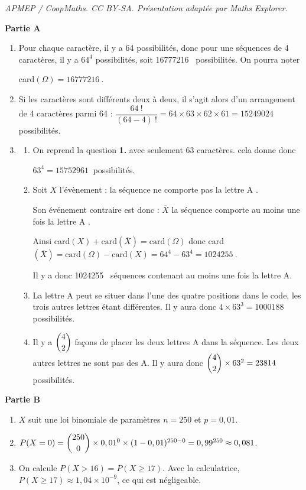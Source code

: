 \documentclass[10pt]{article}
\providecommand{\np}[2][]{{#2~#1}}
\begin{document}
\noindent\textit{APMEP / CoopMaths. CC BY-SA. Présentation adaptée par Maths Explorer.}\par\medskip
\textbf{Partie A}

\medskip
\begin{enumerate}
	\item Pour chaque caractère, il y a 64 possibilités, donc pour une séquences de 4 caractères, il y a $64^4$ possibilités, soit \np{16777216} possibilités. On pourra noter 
	
card$(\Omega)=\np{16777216}$.
	\item Si les caractères sont différents deux à deux, il s'agit alors d'un arrangement de 4 caractères parmi 64 : $\dfrac{64~!}{(64-4)~!}=64 \times 63 \times 62 \times 61=\np{15249024}$ possibilités.
	\item 
	\begin{enumerate}
		\item On reprend la question \textbf{1.} avec seulement 63 caractères. cela donne donc

$63^4=\np{15752961}$ possibilités.
		\item Soit $X$ l'évènement : \og la séquence ne comporte pas la lettre A \fg.

Son événement contraire est donc : $\overline{X}$ \og la séquence comporte au moins une fois la lettre A \fg{}.

		Ainsi card$(X) + \text{card}(\overline{X})= \text{card}(\Omega)$ donc card$(\overline{X}) = \text{card}(\Omega) - \text{card}(X) = 64^4 - 63^4 = \np{1024255}$.

Il y a donc \np{1024255} séquences contenant au moins une fois la lettre A.
		\item La lettre A peut se situer dans l'une des quatre positions dans le code, les trois autres lettres étant différentes. Il y aura donc $4\times 63^3 = \np{1000188}$ possibilités.
		\item Il y a $\dbinom{4}{2}$ façons de placer les deux lettres A dans la séquence. Les deux autres lettres ne sont pas des A. Il y aura donc $\dbinom{4}{2} \times 63^2 = \np{23814}$ possibilités.
	\end{enumerate}
\end{enumerate}

\medskip

\textbf{Partie B}

\medskip

\begin{enumerate}
	\item $X$ suit une loi binomiale de paramètres $n=250$ et $p=0,01$.
	\item $P(X=0)=\dbinom{250}{0}\times 0,01^0\times (1-0,01)^{250-0}=0,99^{250}\approx 0,081$.
	\item On calcule $P(X >16)= P(X\geqslant 17)$. Avec la calculatrice, $P(X\geqslant 17)\approx 1,04\times 10^{-9}$, ce qui est négligeable.
\end{enumerate}
\end{document}
